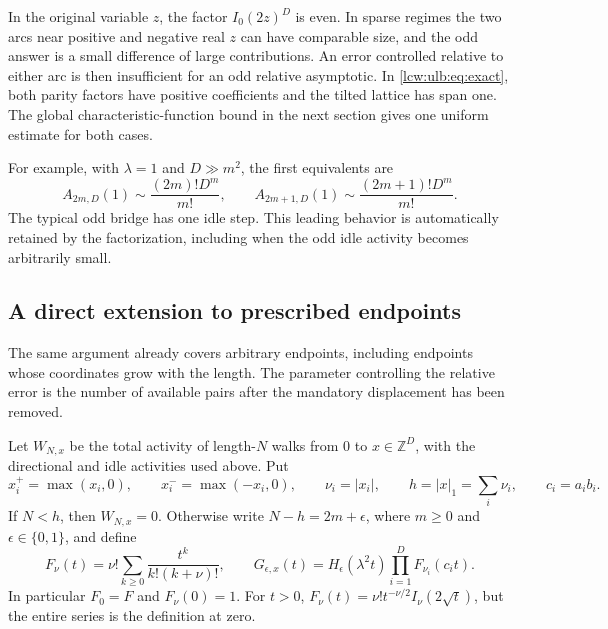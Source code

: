 \documentclass[11pt,letterpaper]{article}
\theoremstyle{remark}\newtheorem{remark}[theorem]{Remark}
\newcommand{\Z}{\mathbb Z}
\begin{document}
In the original variable $z$, the factor $I_0(2z)^D$ is even. In
sparse regimes the two arcs near positive and negative real $z$ can
have comparable size, and the odd answer is a small difference of
large contributions. An error controlled relative to either arc is
then insufficient for an odd relative asymptotic. In
\eqref{lcw:ulb:eq:exact}, both parity factors have positive coefficients
and the tilted lattice has span one. The global characteristic-function
bound in the next section gives one uniform estimate for both cases.

For example, with $\lambda=1$ and $D\gg m^2$, the first equivalents are
\[
 A_{2m,D}(1)\sim\frac{(2m)!D^m}{m!},\qquad
 A_{2m+1,D}(1)\sim\frac{(2m+1)!D^m}{m!}.
\]
The typical odd bridge has one idle step. This leading behavior is
automatically retained by the factorization, including when the odd
idle activity becomes arbitrarily small.


\subsection{A direct extension to prescribed endpoints}
\label{lcw:ulb:subsec:endpoints}

The same argument already covers arbitrary endpoints, including endpoints
whose coordinates grow with the length. The parameter controlling the
relative error is the number of available pairs after the mandatory
displacement has been removed.

Let $W_{N,x}$ be the total activity of length-$N$ walks from $0$ to
$x\in\Z^D$, with the directional and idle activities used above. Put
\[
 x_i^+=\max(x_i,0),\qquad x_i^-=\max(-x_i,0),\qquad
 \nu_i=|x_i|,\qquad h=|x|_1=\sum_i\nu_i,\qquad c_i=a_ib_i.
\]
If $N<h$, then $W_{N,x}=0$. Otherwise write
$N-h=2m+\epsilon$, where $m\ge0$ and $\epsilon\in\{0,1\}$, and define
\[
 F_\nu(t)=\nu!\sum_{k\ge0}\frac{t^k}{k!(k+\nu)!},
 \qquad
 G_{\epsilon,x}(t)=H_\epsilon(\lambda^2t)
                    \prod_{i=1}^D F_{\nu_i}(c_it).
\]
In particular $F_0=F$ and $F_\nu(0)=1$. For $t>0$,
$F_\nu(t)=\nu!t^{-\nu/2}I_\nu(2\sqrt t)$, but the entire series is
the definition at zero.
\end{document}
